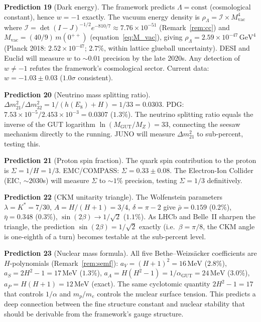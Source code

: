 \documentclass[11pt,a4paper]{article}
\theoremstyle{definition}
\theoremstyle{remark}
\begin{document}
\textbf{Prediction 19} (Dark energy). The framework predicts $\Lambda=\mathrm{const}$ (cosmological constant), hence $w=-1$ exactly. The vacuum energy density is $\rho_\Lambda=\mathcal{I}\times M_{\mathrm{vac}}^4$ where $\mathcal{I}=\det(I-J)^{-1/2}e^{-810/7}\approx 7.76\times 10^{-51}$ (Remark~\ref{rem:cc}) and $M_{\mathrm{vac}}=(40/9)\,m(0^{++})$ (equation~\ref{eq:M_vac}), giving $\rho_\Lambda=2.59\times 10^{-47}\,\mathrm{GeV}^4$ (Planck 2018: $2.52\times 10^{-47}$; $2.7\%$, within lattice glueball uncertainty). DESI and Euclid will measure $w$ to $\sim\!0.01$ precision by the late 2020s. Any detection of $w\neq -1$ refutes the framework's cosmological sector. Current data: $w=-1.03\pm 0.03$ ($1.0\sigma$ consistent).

\textbf{Prediction 20} (Neutrino mass splitting ratio). $\Delta m^2_{21}/\Delta m^2_{32}=1/(h(E_8)+H)=1/33=0.0303$. PDG: $7.53\times 10^{-5}/2.453\times 10^{-3}=0.0307$ ($1.3\%$). The neutrino splitting ratio equals the inverse of the GUT logarithm $\ln(M_\mathrm{GUT}/M_Z)=33$, connecting the seesaw mechanism directly to the running. JUNO will measure $\Delta m^2_{21}$ to sub-percent, testing this.

\textbf{Prediction 21} (Proton spin fraction). The quark spin contribution to the proton is $\Sigma=1/H=1/3$. EMC/COMPASS: $\Sigma=0.33\pm 0.08$. The Electron-Ion Collider (EIC, $\sim\!2030$s) will measure $\Sigma$ to $\sim\!1\%$ precision, testing $\Sigma=1/3$ definitively.

\textbf{Prediction 22} (CKM unitarity triangle). The Wolfenstein parameters $\lambda=K^*=7/30$, $A=H/(H+1)=3/4$, $\delta=\pi-2$ give $\bar\rho=0.159$ ($0.2\%$), $\bar\eta=0.348$ ($0.3\%$), $\sin(2\beta)\to 1/\sqrt{2}$ ($1.1\%$). As LHCb and Belle~II sharpen the triangle, the prediction $\sin(2\beta)=1/\sqrt{2}$ exactly (i.e.\ $\beta=\pi/8$, the CKM angle is one-eighth of a turn) becomes testable at the sub-percent level.

\textbf{Prediction 23} (Nuclear mass formula). All five Bethe--Weizs\"acker coefficients are $H$-polynomials (Remark~\ref{rem:semf}): $a_V=(H+1)^2=16\,\mathrm{MeV}$ ($2.8\%$), $a_S=2H^2-1=17\,\mathrm{MeV}$ ($1.3\%$), $a_A=H(H^2-1)=1/\alpha_\mathrm{GUT}=24\,\mathrm{MeV}$ ($3.0\%$), $a_P=H(H+1)=12\,\mathrm{MeV}$ (exact). The same cyclotomic quantity $2H^2-1=17$ that controls $1/\alpha$ and $m_p/m_e$ controls the nuclear surface tension. This predicts a deep connection between the fine structure constant and nuclear stability that should be derivable from the framework's gauge structure.
\end{document}
